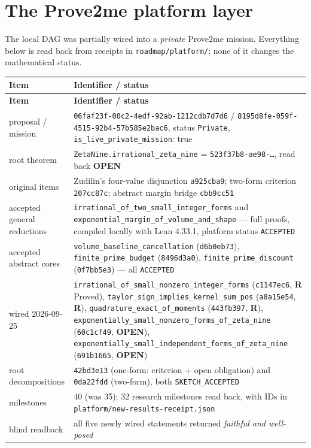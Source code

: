 \documentclass[11pt]{article}
\newcommand{\stR}{\textcolor{okgreen}{\textbf{R}}}
\newcommand{\stO}{\textcolor{gapred}{\textbf{OPEN}}}
\begin{document}
\section{The Prove2me platform layer}
\label{sec:platform}

The local DAG was partially wired into a \emph{private} Prove2me mission. Everything below is
read back from receipts in \texttt{roadmap/platform/}; none of it changes the mathematical status.

\begin{longtable}{@{}p{}p{}@{}}
\toprule \textbf{Item} & \textbf{Identifier / status} \\ \midrule
\endfirsthead
\toprule \textbf{Item} & \textbf{Identifier / status} \\ \midrule
\endhead
proposal / mission & \texttt{06faf23f-00c2-4edf-92ab-1212cdb7d7d6} /
    \texttt{8195d8fe-059f-4515-92b4-57b585e2bac6}, status \texttt{Private},
    \texttt{is\_live\_private\_mission}: true \\
root theorem & \texttt{ZetaNine.irrational\_zeta\_nine} = \texttt{523f37b8-ae98-\dots}, read back
    \stO \\
original items & Zudilin's four-value disjunction \texttt{a925cba9}; two-form criterion
    \texttt{207cc87c}; abstract margin bridge \texttt{cbb9cc51} \\
accepted general reductions & \texttt{irrational\_of\_two\_small\_integer\_forms} and
    \texttt{exponential\_margin\_of\_volume\_and\_shape} --- full proofs, compiled locally with Lean
    4.33.1, platform status \texttt{ACCEPTED} \\
accepted abstract cores & \texttt{volume\_baseline\_cancellation} (\texttt{d6b0eb73}),
    \texttt{finite\_prime\_budget} (\texttt{8496d3a0}),
    \texttt{finite\_prime\_discount} (\texttt{0f7bb5e3}) --- all \texttt{ACCEPTED} \\
wired 2026-09-25 & \texttt{irrational\_of\_small\_nonzero\_integer\_forms} (\texttt{c1147ec6},
    \stR{} Proved), \texttt{taylor\_sign\_implies\_kernel\_sum\_pos} (\texttt{a8a15e54}, \stR{}),
    \texttt{quadrature\_exact\_of\_moments} (\texttt{443fb397}, \stR{}),
    \texttt{exponentially\_small\_nonzero\_forms\_of\_zeta\_nine} (\texttt{60c1cf49}, \stO{}),
    \texttt{exponentially\_small\_independent\_forms\_of\_zeta\_nine} (\texttt{691b1665}, \stO{}) \\
root decompositions & \texttt{42bd3e13} (one-form: criterion + open obligation) and \texttt{0da22fdd}
    (two-form), both \texttt{SKETCH\_ACCEPTED} \\
milestones & 40 (was 35); 32 research milestones read back, with IDs in
    \texttt{platform/new-results-receipt.json} \\
blind readback & all five newly wired statements returned \emph{faithful and well-posed} \\
\bottomrule
\end{longtable}
\end{document}
